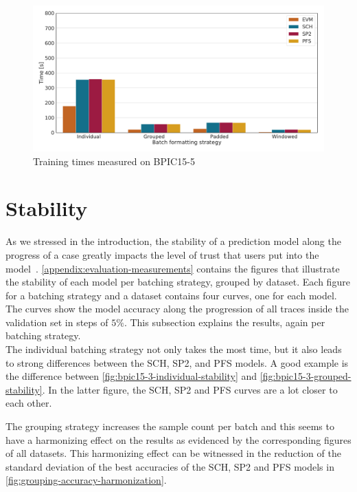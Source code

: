 \begin{figure}
    \centering
    \includegraphics[width=\textwidth]{gfx/bpic2015_5/train_timings.pdf}
    \caption{Training times measured on BPIC15-5}
    \label{fig:BPIC15-5-training-timings}
\end{figure}
\FloatBarrier

\section{Stability}\label{sec:eval:stability}
As we stressed in the introduction, the stability of a prediction model along the progress of a case greatly impacts the level of trust that users put into the model~\cite{metzger2015}. \autoref{appendix:evaluation-measurements} contains the figures that illustrate the stability of each model per batching strategy, grouped by dataset. Each figure for a batching strategy and a dataset contains four curves, one for each model. The curves show the model accuracy along the progression of all traces inside the validation set in steps of $5\%$. This subsection explains the results, again per batching strategy.\\

The individual batching strategy not only takes the most time, but it also leads to strong differences between the SCH, SP2, and PFS models. A good example is the difference between \autoref{fig:bpic15-3-individual-stability} and \autoref{fig:bpic15-3-grouped-stability}. In the latter figure, the SCH, SP2 and PFS curves are a lot closer to each other.

The grouping strategy increases the sample count per batch and this seems to have a harmonizing effect on the results as evidenced by the corresponding figures of all datasets. This harmonizing effect can be witnessed in the reduction of the standard deviation of the best accuracies of the SCH, SP2 and PFS models in \autoref{fig:grouping-accuracy-harmonization}.

